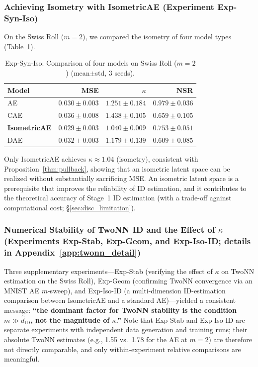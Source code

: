 \documentclass[make,article,submit,pdftex,moreauthors]{Definitions/mdpi}
\newcommand{\kap}{\kappa}
\begin{document}
\subsubsection{Achieving Isometry with IsometricAE (Experiment Exp-Syn-Iso)}

On the Swiss Roll ($m = 2$), we compared the isometry of four model types (Table~\ref{tab:ec}).

\begin{table}[H]
\centering
\caption{Exp-Syn-Iso: Comparison of four models on Swiss Roll ($m=2$) (mean$\pm$std, 3 seeds).}
\label{tab:ec}
\small
\begin{tabular}{lrrr}
\toprule
Model & MSE & $\kap$ & NSR \\
\midrule
AE & $0.030\pm0.003$ & $1.251\pm0.184$ & $0.979\pm0.036$ \\
CAE & $0.036\pm0.008$ & $1.438\pm0.105$ & $0.659\pm0.105$ \\
\textbf{IsometricAE} & $\boldsymbol{0.029\pm0.003}$ & $\boldsymbol{1.040\pm0.009}$ & $0.753\pm0.051$ \\
DAE & $0.032\pm0.003$ & $1.179\pm0.139$ & $0.609\pm0.085$ \\
\bottomrule
\end{tabular}
\end{table}

Only IsometricAE achieves $\kap \approx 1.04$ (isometry), consistent with Proposition~\ref{thm:pullback},
showing that an isometric latent space can be realized without substantially sacrificing MSE.
An isometric latent space is a prerequisite that improves the reliability of ID estimation,
and it contributes to the theoretical accuracy of Stage~1 ID estimation
(with a trade-off against computational cost; \S\ref{sec:disc_limitation}).

\subsubsection{Numerical Stability of TwoNN ID and the Effect of $\kap$ (Experiments Exp-Stab, Exp-Geom, and Exp-Iso-ID; details in Appendix~\ref{app:twonn_detail})}\label{sec:exp_ep}

Three supplementary experiments---Exp-Stab (verifying the effect of $\kap$ on TwoNN estimation
on the Swiss Roll), Exp-Geom (confirming TwoNN convergence via an MNIST AE $m$-sweep),
and Exp-Iso-ID (a multi-dimension ID-estimation comparison between IsometricAE and a standard AE)---yielded a consistent message:
\textbf{``the dominant factor for TwoNN stability is the condition $m \gg \hat{d}_\mathrm{ID}$, not the magnitude of $\kap$.''}
Note that Exp-Stab and Exp-Iso-ID are separate experiments with independent data generation and
training runs; their absolute TwoNN estimates (e.g., 1.55 vs.\ 1.78 for the AE at $m=2$)
are therefore not directly comparable, and only within-experiment relative comparisons are meaningful.
\end{document}
